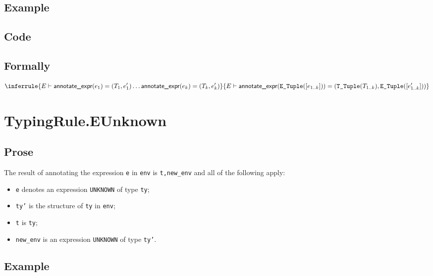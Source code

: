 \documentclass{book}
\newcommand\annotateexpr[1]{\textsf{annotate\_expr}(#1)}
\begin{document}
  \subsection{Example}

  \subsection{Code}

\begin{emptyformal}
    \subsection{Formally}
\[
\inferrule{E \entails \annotateexpr{e_1} = (T_1, e_1') \ldots \annotateexpr{e_k} = (T_k, e_k')}
{
E \entails \annotateexpr{\texttt{E\_Tuple}([e_{1..k}])} = (\TTuple(T_{1..k}), \texttt{E\_Tuple}([e'_{1..k}]))
}
\]
\end{emptyformal}


\section{TypingRule.EUnknown \label{sec:TypingRule.EUnknown}}

  \subsection{Prose}
  The result of annotating the expression \texttt{e} in \texttt{env} is
\texttt{t,new\_env} and all of the following apply:
  \begin{itemize}
  \item \texttt{e} denotes an expression \texttt{UNKNOWN} of type \texttt{ty};
  \item \texttt{ty'} is the structure of \texttt{ty} in \texttt{env};
  \item \texttt{t} is \texttt{ty};
  \item \texttt{new\_env} is an expression \texttt{UNKNOWN} of type \texttt{ty'}.
  \end{itemize}

  \subsection{Example}
\end{document}
